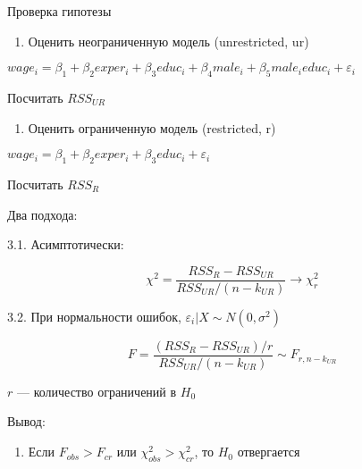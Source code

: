\documentclass[russian,ignorenonframetext,]{beamer}
\providecommand{\tightlist}{%
  \setlength{\itemsep}{0pt}\setlength{\parskip}{0pt}}
\begin{document}
\begin{frame}{Проверка гипотезы}

\begin{enumerate}
\def\labelenumi{\arabic{enumi}.}
\tightlist
\item
  Оценить неограниченную модель (unrestricted, ur)
\end{enumerate}

\(wage_i = \beta_1 + \beta_2 exper_i + \beta_3 educ_i + \beta_4 male_i + \beta_5 male_i educ_i + \varepsilon_i\)

Посчитать \(RSS_{UR}\)

\begin{enumerate}
\def\labelenumi{\arabic{enumi}.}
\setcounter{enumi}{1}
\tightlist
\item
  Оценить ограниченную модель (restricted, r)
\end{enumerate}

\(wage_i = \beta_1 + \beta_2 exper_i + \beta_3 educ_i + \varepsilon_i\)

Посчитать \(RSS_{R}\)

\end{frame}

\begin{frame}{Два подхода:}

3.1. Асимптотически:

\[
\chi^2=\frac{RSS_R-RSS_{UR}}{RSS_{UR}/(n-k_{UR})} \to \chi^2_r
\]

3.2. При нормальности ошибок, \(\varepsilon_i |X \sim N(0,\sigma^2)\)

\[
F=\frac{(RSS_R-RSS_{UR})/r}{RSS_{UR}/(n-k_{UR})} \sim F_{r, n-k_{UR}}
\]

\(r\) --- количество ограничений в \(H_0\)

\end{frame}

\begin{frame}{Вывод:}

\begin{enumerate}
\def\labelenumi{\arabic{enumi}.}
\setcounter{enumi}{3}
\tightlist
\item
  Если \(F_{obs}>F_{cr}\) или \(\chi^2_{obs}>\chi^2_{cr}\), то \(H_0\)
  отвергается
\end{enumerate}

\end{frame}
\end{document}
